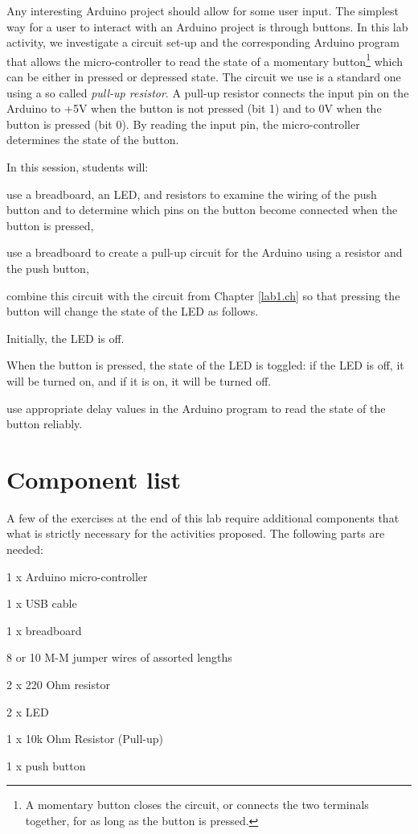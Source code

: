 \documentclass[12pt]{book}
\begin{document}
Any interesting Arduino project should allow for some user input. The
simplest way for a user to interact with an Arduino project is through
buttons. 
In this lab activity, we investigate a circuit set-up and the
corresponding Arduino program that allows the micro-controller to read
the state of a momentary button\footnote{A momentary button closes the
  circuit, or connects the two terminals together, for as long as the
  button is pressed.} which can be either in pressed or depressed state. The circuit we use is a
standard one using a so called \emph{pull-up resistor}. A pull-up
resistor  connects the input pin on the Arduino to +5V when the button is
not pressed (bit 1) and to 0V when the button is pressed (bit 0). By
reading the input pin, the micro-controller determines the state of
the button. 

In this session, students will:
\begin{compactitem}[--]
\item use a breadboard, an LED, and resistors to examine the wiring of
  the push button and to determine which pins on the button become connected when the
  button is pressed, 
\item use a breadboard to create a pull-up circuit for the Arduino using a
  resistor and the push button,
\item combine this circuit with the circuit from Chapter
  \ref{lab1.ch} so that pressing the button will change the state of
  the LED as follows.
\begin{compactitem}[-]
\item Initially, the LED is off.
\item When the button is pressed, the state of the LED is toggled: if
  the LED is off, it will be turned on, and if it is on, it will be
  turned off. 
\end{compactitem}
\item use appropriate delay values in the Arduino program to read the
  state of the button reliably. 
\end{compactitem}


\section{Component list}

A few of the exercises at the end of this lab require additional components that what is strictly necessary for the activities proposed. The following
parts are needed:
\begin{compactitem}[--]
  \item 1 x Arduino micro-controller
  \item 1 x USB cable
  \item 1 x breadboard
  \item 8 or 10 M-M jumper wires of assorted lengths
	\item 2 x 220 Ohm resistor
	\item 2 x LED
  \item 1 x 10k Ohm Resistor (Pull-up)
  \item 1 x push button
\end{compactitem}
\end{document}
